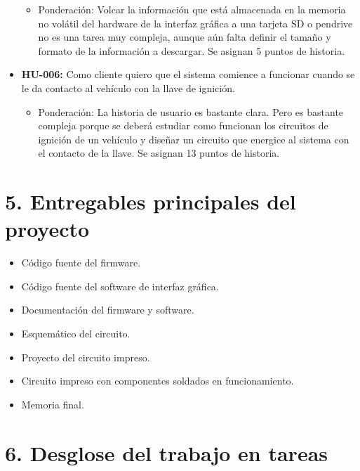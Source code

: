 \documentclass[11pt]{charter}
\begin{document}
\begin{itemize}
\begin{itemize}
	\item Ponderación: Volcar la información que está almacenada en la memoria no volátil del hardware de la interfaz gráfica a una tarjeta SD o pendrive no es una tarea muy compleja, aunque aún falta definir el tamaño y formato de la información a descargar. Se asignan 5 puntos de historia.
	\end{itemize}
\item \textbf{HU-006:} Como cliente quiero que el sistema comience a funcionar cuando se le da contacto al vehículo con la llave de ignición.
	\begin{itemize}
	\item Ponderación: La historia de usuario es bastante clara. Pero es bastante compleja porque se deberá estudiar como funcionan los circuitos de ignición de un vehículo y diseñar un circuito que energice al sistema con el contacto de la llave. Se asignan 13 puntos de historia.
	\end{itemize}
\end{itemize}

\section{5. Entregables principales del proyecto}
\label{sec:entregables}

\begin{itemize}
\item Código fuente del firmware.
\item Código fuente del software de interfaz gráfica.
\item Documentación del firmware y software.
\item Esquemático del circuito.
\item Proyecto del circuito impreso.
\item Circuito impreso con componentes soldados en funcionamiento.
\item Memoria final.
\end{itemize}

\section{6. Desglose del trabajo en tareas}
\label{sec:wbs}
\end{document}
